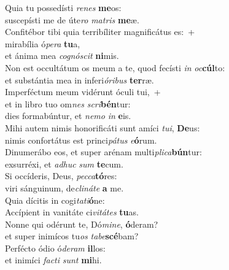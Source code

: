 \evenverse Quia tu possedísti \textit{re}\textit{nes} \textbf{me}os:~\*\\
\evenverse suscepísti me de úte\textit{ro} \textit{ma}\textit{tris} \textbf{me}æ.\\
\oddverse Confitébor tibi quia terribíliter magnificátus es:~+\\
\oddverse  mirabília ó\textit{pe}\textit{ra} \textbf{tu}a,~\*\\
\oddverse et ánima mea \textit{co}\textit{gnó}\textit{scit} \textbf{ni}mis.\\
\evenverse Non est occultátum os meum a te, quod fecísti \textit{in} \textit{oc}\textbf{cúl}to:~\*\\
\evenverse et substántia mea in inferi\textit{ó}\textit{ri}\textit{bus} \textbf{ter}ræ.\\
\oddverse Imperféctum meum vidérunt óculi tui,~+\\
\oddverse  et in libro tuo om\textit{nes} \textit{scri}\textbf{bén}tur:~\*\\
\oddverse dies formabúntur, et \textit{ne}\textit{mo} \textit{in} \textbf{e}is.\\
\evenverse Mihi autem nimis honorificáti sunt amíci \textit{tu}\textit{i}, \textbf{De}us:~\*\\
\evenverse nimis confortátus est princi\textit{pá}\textit{tus} \textit{e}\textbf{ó}rum.\\
\oddverse Dinumerábo eos, et super arénam multi\textit{pli}\textit{ca}\textbf{bún}tur:~\*\\
\oddverse exsurréxi, et \textit{a}\textit{dhuc} \textit{sum} \textbf{te}cum.\\
\evenverse Si occíderis, Deus, \textit{pec}\textit{ca}\textbf{tó}res:~\*\\
\evenverse viri sánguinum, de\textit{cli}\textit{ná}\textit{te} \textbf{a} me.\\
\oddverse Quia dícitis in cogi\textit{ta}\textit{ti}\textbf{ó}ne:~\*\\
\oddverse Accípient in vanitáte ci\textit{vi}\textit{tá}\textit{tes} \textbf{tu}as.\\
\evenverse Nonne qui odérunt te, Dó\textit{mi}\textit{ne}, \textbf{ó}deram?~\*\\
\evenverse et super inimícos tu\textit{os} \textit{ta}\textit{be}\textbf{scé}bam?\\
\oddverse Perfécto ódio ó\textit{de}\textit{ram} \textbf{il}los:~\*\\
\oddverse et inimíci \textit{fa}\textit{cti} \textit{sunt} \textbf{mi}hi.\\
